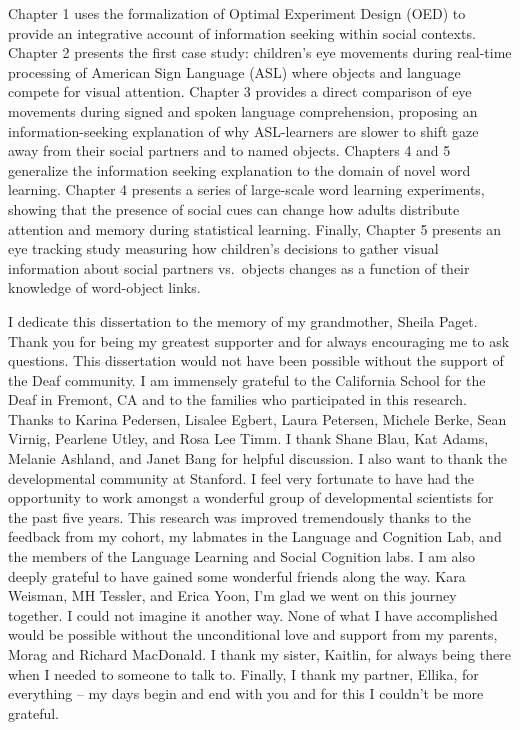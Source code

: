 \documentclass[oneside]{report}
\begin{document}
Chapter 1 uses the formalization of Optimal Experiment Design (OED) to
provide an integrative account of information seeking within social
contexts. Chapter 2 presents the first case study: children's eye
movements during real-time processing of American Sign Language (ASL)
where objects and language compete for visual attention. Chapter 3
provides a direct comparison of eye movements during signed and spoken
language comprehension, proposing an information-seeking explanation of
why ASL-learners are slower to shift gaze away from their social
partners and to named objects. Chapters 4 and 5 generalize the
information seeking explanation to the domain of novel word learning.
Chapter 4 presents a series of large-scale word learning experiments,
showing that the presence of social cues can change how adults
distribute attention and memory during statistical learning. Finally,
Chapter 5 presents an eye tracking study measuring how children's
decisions to gather visual information about social partners vs.~objects
changes as a function of their knowledge of word-object links.

I dedicate this dissertation to the memory of my grandmother, Sheila
Paget. Thank you for being my greatest supporter and for always
encouraging me to ask questions.
This dissertation would not have been possible without the support of
the Deaf community. I am immensely grateful to the California School for
the Deaf in Fremont, CA and to the families who participated in this
research. Thanks to Karina Pedersen, Lisalee Egbert, Laura Petersen,
Michele Berke, Sean Virnig, Pearlene Utley, and Rosa Lee Timm. I thank
Shane Blau, Kat Adams, Melanie Ashland, and Janet Bang for helpful
discussion. I also want to thank the developmental community at
Stanford. I feel very fortunate to have had the opportunity to work
amongst a wonderful group of developmental scientists for the past five
years. This research was improved tremendously thanks to the feedback
from my cohort, my labmates in the Language and Cognition Lab, and the
members of the Language Learning and Social Cognition labs. I am also
deeply grateful to have gained some wonderful friends along the way.
Kara Weisman, MH Tessler, and Erica Yoon, I'm glad we went on this
journey together. I could not imagine it another way. None of what I
have accomplished would be possible without the unconditional love and
support from my parents, Morag and Richard MacDonald. I thank my sister,
Kaitlin, for always being there when I needed to someone to talk to.
Finally, I thank my partner, Ellika, for everything -- my days begin and
end with you and for this I couldn't be more grateful.
\end{document}
